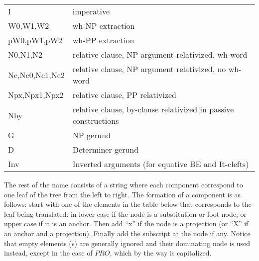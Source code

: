 \begin{description} 
\item\begin{tabular}{ll} 
I&imperative\\ 
W0,W1,W2&wh-NP extraction\\ 
pW0,pW1,pW2&wh-PP extraction\\ 
N0,N1,N2&relative clause, NP argument relativized, wh-word \\ 
Nc,Nc0,Nc1,Nc2&relative clause, NP argument relativized, no wh-word \\ 
Npx,Npx1,Npx2&relative clause, PP relativized \\ 
Nby& relative clause, by-clause relativized in passive constructions\\ 
G&NP gerund\\ 
D&Determiner gerund\\ 
Inv&Inverted arguments (for equative BE and It-clefts) 
\end{tabular} 
\end{description} 
 
 
 
 
\noindent The rest of the name consists of a string where each component 
correspond to one leaf of the tree from the left to right. The formation 
of a component is as follows: start with one of the elements in the table 
below that corresponds to the leaf being translated: in lower case if the 
node is a substitution or foot node; 
 or upper case if it is an anchor. Then add 
``x'' if the node is a projection (or ``X'' if an anchor and a projection). 
Finally add the subscript at the node if any. 
Notice that empty elements ($\epsilon$) are generally ignored and their 
dominating node is used instead, except in the case of $PRO$, which by the 
way is capitalized. 
 
